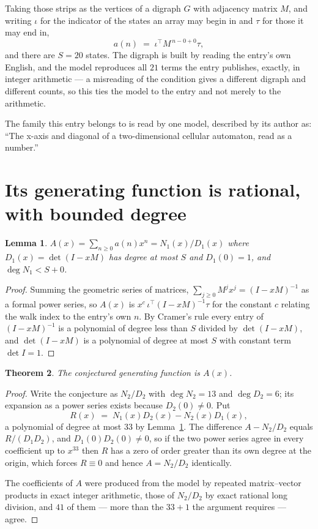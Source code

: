 \documentclass[11pt,a4paper]{article}
\theoremstyle{plain}
\newtheorem{theorem}{Theorem}
\newtheorem{lemma}[theorem]{Lemma}
\theoremstyle{definition}
\begin{document}
Taking those strips as the vertices of a digraph $G$ with adjacency matrix $M$, and writing
$\iota$ for the indicator of the states an array may begin in and $\tau$ for those it may end
in,
\[
a(n)\;=\;\iota^{\!\top}M^{\,n-0+0}\tau ,
\]
and there are $S=20$ states. The digraph is built by reading the entry's own English, and the
model reproduces all $21$ terms the entry publishes, exactly, in integer arithmetic --- a
misreading of the condition gives a different digraph and different counts, so this ties the
model to the entry and not merely to the arithmetic.

The family this entry belongs to is read by one model, described by its author as: ``The x-axis and diagonal of a two-dimensional cellular automaton, read as a number.''


\section{Its generating function is rational, with bounded degree}

\begin{lemma}\label{lem:rat}
$A(x)=\sum_{n\ge0}a(n)x^n=N_1(x)/D_1(x)$ where $D_1(x)=\det(I-xM)$ has degree at most
$S$ and $D_1(0)=1$, and $\deg N_1<S+0$.
\end{lemma}

\begin{proof}
Summing the geometric series of matrices, $\sum_{j\ge0}M^jx^j=(I-xM)^{-1}$ as a formal
power series, so $A(x)$ is $x^{c}\,\iota^{\!\top}(I-xM)^{-1}\tau$ for the constant $c$
relating the walk index to the entry's own $n$. By Cramer's rule every entry of
$(I-xM)^{-1}$ is a polynomial of degree less than $S$ divided by $\det(I-xM)$, and
$\det(I-xM)$ is a polynomial of degree at most $S$ with constant term $\det I=1$.
\end{proof}

\begin{theorem}
The conjectured generating function is $A(x)$.
\end{theorem}

\begin{proof}
Write the conjecture as $N_2/D_2$ with $\deg N_2=13$ and $\deg D_2=6$; its expansion as a
power series exists because $D_2(0)\neq0$. Put
\[
R(x)\;=\;N_1(x)D_2(x)-N_2(x)D_1(x),
\]
a polynomial of degree at most $33$ by Lemma~\ref{lem:rat}. The difference
$A-N_2/D_2$ equals $R/(D_1D_2)$, and $D_1(0)D_2(0)\neq0$, so if the two power series agree in
every coefficient up to $x^{33}$ then $R$ has a zero of order greater than its own
degree at the origin, which forces $R\equiv0$ and hence $A=N_2/D_2$ identically.

The coefficients of $A$ were produced from the model by repeated matrix--vector products in
exact integer arithmetic, those of $N_2/D_2$ by exact rational long division, and $41$
of them --- more than the $33+1$ the argument requires --- agree.
\end{proof}
\end{document}

